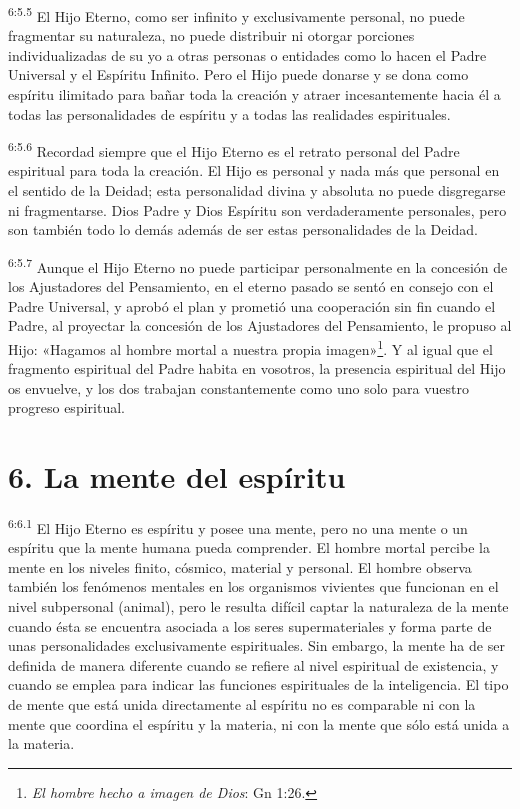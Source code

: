 \par
\textsuperscript{6:5.5} El Hijo Eterno, como ser infinito y exclusivamente personal, no puede fragmentar su naturaleza, no puede distribuir ni otorgar porciones individualizadas de su yo a otras personas o entidades como lo hacen el Padre Universal y el Espíritu Infinito. Pero el Hijo puede donarse y se dona como espíritu ilimitado para bañar toda la creación y atraer incesantemente hacia él a todas las personalidades de espíritu y a todas las realidades espirituales.

\par
\textsuperscript{6:5.6} Recordad siempre que el Hijo Eterno es el retrato personal del Padre espiritual para toda la creación. El Hijo es personal y nada más que personal en el sentido de la Deidad; esta personalidad divina y absoluta no puede disgregarse ni fragmentarse. Dios Padre y Dios Espíritu son verdaderamente personales, pero son también todo lo demás además de ser estas personalidades de la Deidad.

\par
\textsuperscript{6:5.7} Aunque el Hijo Eterno no puede participar personalmente en la concesión de los Ajustadores del Pensamiento, en el eterno pasado se sentó en consejo con el Padre Universal, y aprobó el plan y prometió una cooperación sin fin cuando el Padre, al proyectar la concesión de los Ajustadores del Pensamiento, le propuso al Hijo: «Hagamos al hombre mortal a nuestra propia imagen»\footnote{\textit{El hombre hecho a imagen de Dios}: Gn 1:26.}. Y al igual que el fragmento espiritual del Padre habita en vosotros, la presencia espiritual del Hijo os envuelve, y los dos trabajan constantemente como uno solo para vuestro progreso espiritual.

\section*{6. La mente del espíritu}
\par
\textsuperscript{6:6.1} El Hijo Eterno es espíritu y posee una mente, pero no una mente o un espíritu que la mente humana pueda comprender. El hombre mortal percibe la mente en los niveles finito, cósmico, material y personal. El hombre observa también los fenómenos mentales en los organismos vivientes que funcionan en el nivel subpersonal (animal), pero le resulta difícil captar la naturaleza de la mente cuando ésta se encuentra asociada a los seres supermateriales y forma parte de unas personalidades exclusivamente espirituales. Sin embargo, la mente ha de ser definida de manera diferente cuando se refiere al nivel espiritual de existencia, y cuando se emplea para indicar las funciones espirituales de la inteligencia. El tipo de mente que está unida directamente al espíritu no es comparable ni con la mente que coordina el espíritu y la materia, ni con la mente que sólo está unida a la materia.


